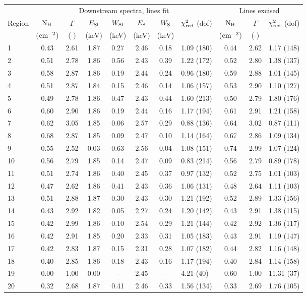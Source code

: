 \begin{tabular}{@{}lcccccclccr@{}}
\toprule
{} & \multicolumn{7}{c}{Downstream spectra, lines fit}
   & \multicolumn{3}{c}{Lines excised} \\
\cmidrule(lr){2-8} \cmidrule(l){9-11}
Region & $\mathrm{N_H}$ & $\Gamma$ & $E_{\mathrm{Si}}$ & $W_{\mathrm{Si}}$
       & $E_{\mathrm{S}}$ & $W_{\mathrm{S}}$ & $\chi^2_{\mathrm{red}}$ (dof)
       & $\mathrm{N_H}$ & $\Gamma$ & $\chi^2_{\mathrm{red}}$ (dof) \\
{} & ($\mathrm{cm}^{-2}$) & (-) & (keV) & (keV) & (keV) & (keV) & {}
   & ($\mathrm{cm}^{-2}$) & (-) & {} \\
\midrule
1  & 0.43 & 2.61 & 1.87 & 0.27 & 2.46 & 0.18 & 1.09 (180) & 0.44 & 2.62 & 1.17 (148) \\
2  & 0.51 & 2.78 & 1.86 & 0.56 & 2.43 & 0.39 & 1.22 (172) & 0.52 & 2.80 & 1.38 (137) \\
3  & 0.58 & 2.87 & 1.86 & 0.19 & 2.44 & 0.24 & 0.96 (180) & 0.59 & 2.88 & 1.01 (145) \\
\cmidrule{1-11}
4  & 0.51 & 2.87 & 1.84 & 0.15 & 2.46 & 0.14 & 1.06 (157) & 0.53 & 2.90 & 1.10 (127) \\
5  & 0.49 & 2.78 & 1.86 & 0.47 & 2.43 & 0.44 & 1.60 (213) & 0.50 & 2.79 & 1.80 (176) \\
6  & 0.60 & 2.90 & 1.86 & 0.19 & 2.44 & 0.16 & 1.17 (194) & 0.61 & 2.91 & 1.21 (158) \\
7  & 0.62 & 3.05 & 1.85 & 0.06 & 2.57 & 0.29 & 0.88 (136) & 0.64 & 3.02 & 0.87 (111) \\
8  & 0.68 & 2.87 & 1.85 & 0.09 & 2.47 & 0.10 & 1.14 (164) & 0.67 & 2.86 & 1.09 (134) \\
9  & 0.55 & 2.52 & 0.03 & 0.63 & 2.56 & 0.04 & 1.08 (151) & 0.74 & 2.99 & 1.07 (124) \\
10 & 0.56 & 2.79 & 1.85 & 0.14 & 2.47 & 0.09 & 0.83 (214) & 0.56 & 2.79 & 0.89 (178) \\
\cmidrule{1-11}
11 & 0.51 & 2.74 & 1.86 & 0.40 & 2.45 & 0.37 & 0.97 (132) & 0.52 & 2.75 & 1.01 (103) \\
12 & 0.47 & 2.62 & 1.86 & 0.41 & 2.43 & 0.36 & 1.06 (131) & 0.48 & 2.64 & 1.11 (103) \\
13 & 0.51 & 2.88 & 1.87 & 0.30 & 2.43 & 0.30 & 1.21 (192) & 0.52 & 2.89 & 1.33 (156) \\
\cmidrule{1-11}
14 & 0.43 & 2.92 & 1.82 & 0.05 & 2.27 & 0.24 & 1.20 (142) & 0.43 & 2.91 & 1.38 (115) \\
15 & 0.42 & 2.99 & 1.86 & 0.10 & 2.54 & 0.29 & 1.21 (144) & 0.42 & 2.92 & 1.36 (117) \\
16 & 0.42 & 2.91 & 1.85 & 0.20 & 2.33 & 0.31 & 1.05 (183) & 0.43 & 2.91 & 1.19 (147) \\
17 & 0.42 & 2.83 & 1.87 & 0.15 & 2.31 & 0.28 & 1.07 (182) & 0.44 & 2.82 & 1.16 (148) \\
\cmidrule{1-11}
18 & 0.40 & 2.85 & 1.86 & 0.18 & 2.43 & 0.16 & 1.17 (194) & 0.40 & 2.84 & 1.14 (158) \\
19 & 0.00 & 1.00 & 0.00 & -    & 2.45 & -    & 4.21 (40)  & 0.60 & 1.00 & 11.31 (37) \\
20 & 0.32 & 2.68 & 1.87 & 0.41 & 2.46 & 0.33 & 1.56 (134) & 0.33 & 2.69 & 1.76 (105) \\
\bottomrule
\end{tabular}
